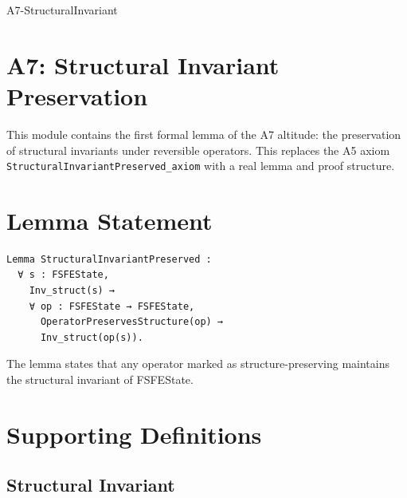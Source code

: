 \documentclass[11pt]{article}
\begin{document}


\begin{citationmembrane}{A7-StructuralInvariant}
\end{citationmembrane}

\section*{A7: Structural Invariant Preservation}

This module contains the first formal lemma of the A7 altitude: the preservation
of structural invariants under reversible operators. This replaces the A5 axiom
\texttt{StructuralInvariantPreserved\_axiom} with a real lemma and proof
structure.

\newpage


\section{Lemma Statement}

\begin{verbatim}
Lemma StructuralInvariantPreserved :
  ∀ s : FSFEState,
    Inv_struct(s) →
    ∀ op : FSFEState → FSFEState,
      OperatorPreservesStructure(op) →
      Inv_struct(op(s)).
\end{verbatim}

The lemma states that any operator marked as structure-preserving maintains the
structural invariant of FSFEState.

\newpage


\section{Supporting Definitions}

\subsection{Structural Invariant}
\end{document}
